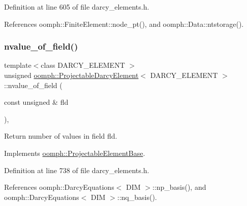 Definition at line 605 of file darcy\+\_\+elements.\+h.



References oomph\+::\+Finite\+Element\+::node\+\_\+pt(), and oomph\+::\+Data\+::ntstorage().

\mbox{\label{classoomph_1_1ProjectableDarcyElement_a5d7312cd8fb27bd36ac014b180bf5f1a}} 
\subsubsection{\texorpdfstring{nvalue\+\_\+of\+\_\+field()}{nvalue\_of\_field()}}
{\footnotesize\ttfamily template$<$class D\+A\+R\+C\+Y\+\_\+\+E\+L\+E\+M\+E\+NT $>$ \\
unsigned \hyperlink{classoomph_1_1ProjectableDarcyElement}{oomph\+::\+Projectable\+Darcy\+Element}$<$ D\+A\+R\+C\+Y\+\_\+\+E\+L\+E\+M\+E\+NT $>$\+::nvalue\+\_\+of\+\_\+field (\begin{DoxyParamCaption}\item[{const unsigned \&}]{fld }\end{DoxyParamCaption})\hspace{0.3cm}{\ttfamily [inline]}, {\ttfamily [virtual]}}



Return number of values in field fld. 



Implements \hyperlink{classoomph_1_1ProjectableElementBase_a1a9a6de16f3511bca8e8be770abb9c2e}{oomph\+::\+Projectable\+Element\+Base}.



Definition at line 738 of file darcy\+\_\+elements.\+h.



References oomph\+::\+Darcy\+Equations$<$ D\+I\+M $>$\+::np\+\_\+basis(), and oomph\+::\+Darcy\+Equations$<$ D\+I\+M $>$\+::nq\+\_\+basis().

\mbox{\label{classoomph_1_1ProjectableDarcyElement_a37aa5179ccb845ed3e9b311758c7ae09}} 
